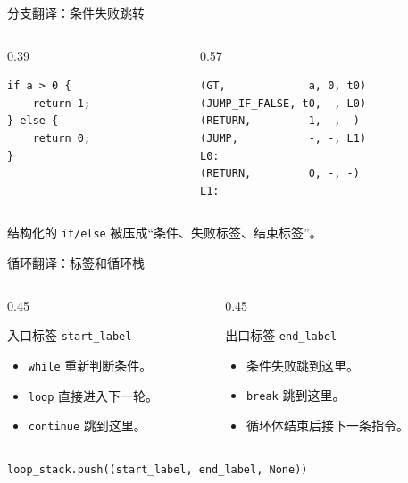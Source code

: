 \documentclass[aspectratio=169]{ctexbeamer}
\begin{document}
\begin{frame}[fragile]{分支翻译：条件失败跳转}
    \begin{columns}[T]
    \begin{column}{0.39\textwidth}
        \begin{lstlisting}[style=tinycode]
if a > 0 {
    return 1;
} else {
    return 0;
}
        \end{lstlisting}
    \end{column}
    \begin{column}{0.57\textwidth}
        \begin{lstlisting}[style=tinycode]
(GT,             a, 0, t0)
(JUMP_IF_FALSE, t0, -, L0)
(RETURN,         1, -, -)
(JUMP,           -, -, L1)
L0:
(RETURN,         0, -, -)
L1:
        \end{lstlisting}
    \end{column}
    \end{columns}
    \vspace{0.2em}
    \centering
    结构化的 \texttt{if/else} 被压成“条件、失败标签、结束标签”。
\end{frame}

\begin{frame}{循环翻译：标签和循环栈}
    \begin{columns}[T]
    \begin{column}{0.45\textwidth}
        \begin{block}{入口标签}
            \centering
            \texttt{start\_label}
        \end{block}
        \begin{itemize}
            \item \texttt{while} 重新判断条件。
            \item \texttt{loop} 直接进入下一轮。
            \item \texttt{continue} 跳到这里。
        \end{itemize}
    \end{column}
    \begin{column}{0.45\textwidth}
        \begin{block}{出口标签}
            \centering
            \texttt{end\_label}
        \end{block}
        \begin{itemize}
            \item 条件失败跳到这里。
            \item \texttt{break} 跳到这里。
            \item 循环体结束后接下一条指令。
        \end{itemize}
    \end{column}
    \end{columns}
    \vspace{0.3em}
    \begin{center}
        \texttt{loop\_stack.push((start\_label, end\_label, None))}
    \end{center}
\end{frame}
\end{document}
